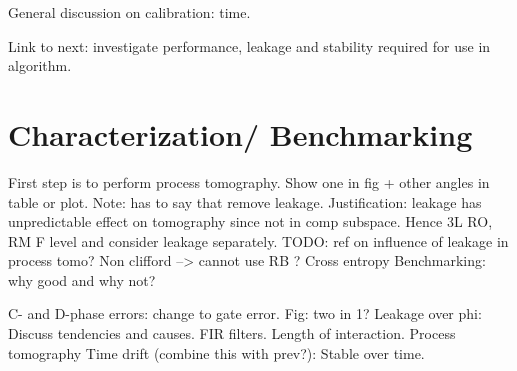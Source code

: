 General discussion on calibration: time.

Link to next: investigate performance, leakage and stability required for use in algorithm.

\section{Characterization/ Benchmarking}
First step is to perform process tomography. Show one in fig + other angles in table or plot. 
Note: has to say that remove leakage. Justification: leakage has unpredictable effect on tomography since not in comp subspace. 
Hence 3L RO, RM F level and consider leakage separately. TODO: ref on influence of leakage in process tomo?
Non clifford --> cannot use RB ? 
Cross entropy Benchmarking: why good and why not?

 C- and D-phase errors: change to gate error. Fig: two in 1?
 Leakage over phi: Discuss tendencies and causes. FIR filters. Length of interaction.
 Process tomography
Time drift (combine this with prev?): Stable over time.